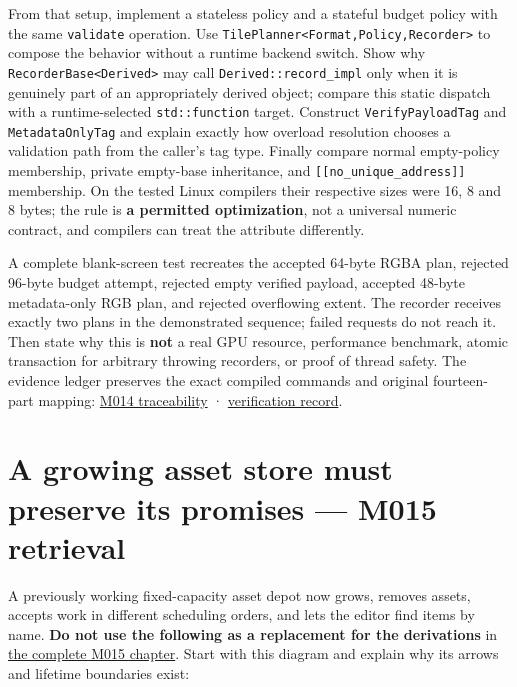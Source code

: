 From that setup, implement a stateless policy and a stateful budget policy with the same \texttt{validate} operation. Use \texttt{TilePlanner\textless{}Format,Policy,Recorder\textgreater{}} to compose the behavior without a runtime backend switch. Show why \texttt{RecorderBase\textless{}Derived\textgreater{}} may call \texttt{Derived::record\_impl} only when it is genuinely part of an appropriately derived object; compare this static dispatch with a runtime-selected \texttt{std::function} target. Construct \texttt{VerifyPayloadTag} and \texttt{MetadataOnlyTag} and explain exactly how overload resolution chooses a validation path from the caller's tag type. Finally compare normal empty-policy membership, private empty-base inheritance, and \texttt{{[}{[}no\_unique\_address{]}{]}} membership. On the tested Linux compilers their respective sizes were 16, 8 and 8 bytes; the rule is \textbf{a permitted optimization}, not a universal numeric contract, and compilers can treat the attribute differently.

A complete blank-screen test recreates the accepted 64-byte RGBA plan, rejected 96-byte budget attempt, rejected empty verified payload, accepted 48-byte metadata-only RGB plan, and rejected overflowing extent. The recorder receives exactly two plans in the demonstrated sequence; failed requests do not reach it. Then state why this is \textbf{not} a real GPU resource, performance benchmark, atomic transaction for arbitrary throwing recorders, or proof of thread safety. The evidence ledger preserves the exact compiled commands and original fourteen-part mapping: \hyperref[appendix-fd090d982a15-m014-parts-217230-one-tile-planner-and-its-compile-time-policy-decisions]{M014 traceability} · \hyperref[appendix-a103e7846d21-phase-4-additive-reconstruction-m014-parts-217230]{verification record}.

\section{A growing asset store must preserve its promises --- M015 retrieval}\label{appendix-960160274237-a-growing-asset-store-must-preserve-its-promises-m015-retrieval}

A previously working fixed-capacity asset depot now grows, removes assets, accepts work in different scheduling orders, and lets the editor find items by name. \textbf{Do not use the following as a replacement for the derivations} in \href{Continuous\%20Notes/Computing\%20Foundations\%20-\%20From\%20Bits\%20to\%20C++\%20and\%20Systems\%20APIs\#An\%20asset\%20registry\%20grows\%20while\%20its\%20handles\%20must\%20not\%20change}{the complete M015 chapter}. Start with this diagram and explain why its arrows and lifetime boundaries exist:

